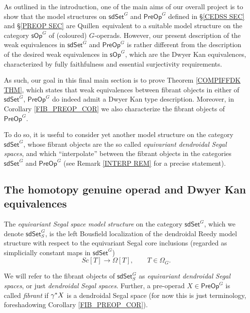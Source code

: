 \documentclass[a4paper,10pt
,draft
]{article}%
\begin{document}
As outlined in the introduction, one of the main aims of our overall project is to show that the model structures on 
$\mathsf{sdSet}^G$ and $\mathsf{PreOp}^G$
defined in \S \ref{CEDSS SEC} and \S \ref{PREOP SEC}
are Quillen\ equivalent to a suitable model structure on the category 
$\mathsf{sOp}^G$ of (coloured) $G$-operads.
However, our present description of the weak equivalences in 
$\mathsf{sdSet}^G$ and $\mathsf{PreOp}^G$
is rather different from the description of the desired weak equivalences in $\mathsf{sOp}^G$,
which are the Dwyer Kan equivalences, 
characterized by fully faithfulness and essential surjectivity requirements.

As such, our goal in this final main section is to prove
Theorem \ref{COMPIFFDK THM},
which states that weak equivalences between fibrant objects in either of $\mathsf{sdSet}^G$, $\mathsf{PreOp}^G$
do indeed admit a Dwyer Kan type description.
Moreover, in Corollary \ref{FIB_PREOP_COR} we also characterize the fibrant objects of $\mathsf{PreOp}^G$.

To do so, it is useful to consider yet another model structure on the category $\mathsf{sdSet}^G$,
whose fibrant objects are the so called
\textit{equivariant dendroidal Segal spaces},
and which ``interpolate''
between the fibrant objects 
in the categories $\mathsf{sdSet}^G$ and $\mathsf{PreOp}^G$ (see Remark \ref{INTERP REM} for a precise statement).




\subsection{The homotopy genuine operad and Dwyer Kan equivalences}\label{HMPTYGEN SEC}


\begin{definition}
	The \textit{equivariant Segal space model structure} on the category $\mathsf{sdSet}^G$, which we denote 
	$\mathsf{sdSet}^G_S$, 
	is the left Bousfield localization of the dendroidal Reedy model structure with respect to the equivariant Segal core inclusions 
	(regarded as simplicially constant maps in $\mathsf{sdSet}^G$)
\[
	Sc[T] \to \Omega[T], \qquad T \in \Omega_G.
\]
\end{definition}


\begin{notation}\label{FIB_PREOP_NOT}
We will refer to the fibrant objects of
$\mathsf{sdSet}^G_S$
as \textit{equivariant dendroidal Segal spaces}, 
or just \textit{dendroidal Segal spaces}.
Further, a pre-operad $X \in \mathsf{PreOp}^G$ is called \textit{fibrant}
if $\gamma^{\**}X$ is a dendroidal Segal space
(for now this is just terminology,
foreshadowing Corollary \ref{FIB_PREOP_COR}).
\end{notation}
\end{document}
